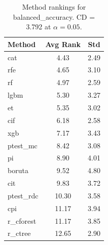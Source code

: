 \begin{table}[h]
\centering
\caption{Method rankings for balanced_accuracy. CD = 3.792 at $\alpha=0.05$.}
\label{tab:ranks_balanced_accuracy}
\begin{tabular}{lcc}
\toprule
Method & Avg Rank & Std \\
\midrule
cat & 4.43 & 2.49 \\
rfe & 4.65 & 3.10 \\
rf & 4.97 & 2.59 \\
lgbm & 5.30 & 3.27 \\
et & 5.35 & 3.02 \\
cif & 6.18 & 2.58 \\
xgb & 7.17 & 3.43 \\
ptest_mc & 8.42 & 3.08 \\
pi & 8.90 & 4.01 \\
boruta & 9.52 & 4.80 \\
cit & 9.83 & 3.72 \\
ptest_rdc & 10.30 & 3.58 \\
cpi & 11.17 & 3.94 \\
r_cforest & 11.17 & 3.85 \\
r_ctree & 12.65 & 2.90 \\
\bottomrule
\end{tabular}
\end{table}